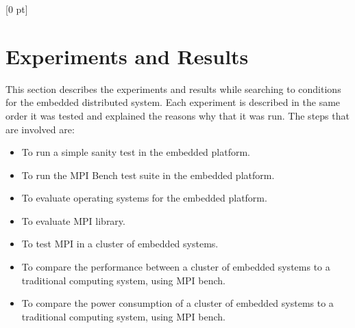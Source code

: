 \titlespacing{\chapter}{0 pt}{30 pt}{50 pt}[0 pt]
\titleformat{\section}{\Large\bfseries}{\thesection}{0 pt}{\hspace{30 pt}}
\titleformat{\subsection}{\large\bfseries}{\thesubsection}{0 pt}{\hspace{30 pt}}
\pagestyle{fancy}
\fancyhead[LO,LE]{\footnotesize\emph{\leftmark}}
\fancyhead[RO,RE]{\thepage}
\fancyfoot[CO,CE]{}

\chapter{Experiments and Results}

\normalsize
\noindent

This section describes the experiments and results while searching to 
conditions for the embedded distributed system. Each experiment is described 
in the same order it was tested and explained the reasons why that it was run.
The steps that are involved are: 

\begin{itemize}
\item To run a simple sanity test in the embedded platform.
\item To run the MPI Bench test suite in the embedded platform.
\item To evaluate operating systems for the embedded platform.
\item To evaluate MPI library.
\item To test MPI in a cluster of embedded systems.
\item To compare the performance between a cluster of embedded systems to a
traditional computing system, using MPI bench.
\item To compare the power consumption of a cluster of embedded systems to a
traditional computing system, using MPI bench.
\end{itemize}

